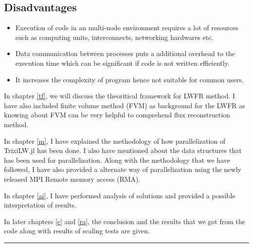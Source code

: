 \subsection{Disadvantages}
\begin{itemize}
    \item Execution of code in an multi-node environment requires a lot of resources such as computing units, interconnects, networking hardwares etc.
    \item Data communication between processes puts a additional overhead to the execution time which can be significant if code is not written efficiently.
    \item It increases the complexity of program hence not suitable for common users.
\end{itemize}
In chapter \ref{tf}, we will discuss the theoritical framework for LWFR method. I have also included finite volume method (FVM) as background for the LWFR as knowing about FVM can be very helpful to comprehend flux reconstruction method.

\vspace{5pt}In chapter \ref{m}, I have explained the methodology of how parallelization of {\ttfamily TrixiLW.jl} has been done. I also have mentioned about the data structures that has been used for parallelization.
Along with the methodology that we have followed, I have also provided a alternate way of parallelization using the newly released MPI Remote memory access (RMA).

\vspace{5pt}In chapter \ref{ai}, I have performed analysis of solutions and provided a possible interpretation of results.

\vspace{5pt}In later chapters \ref{c} and \ref{ra}, the conclusion and the results that we got from the code along with results of scaling tests are given.

\begin{center}
    \rule{3cm}{1pt}
\end{center}
